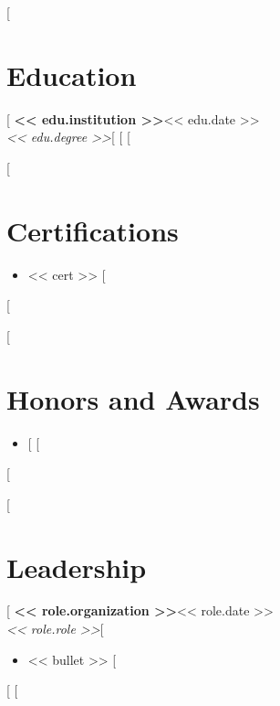 \documentclass[letterpaper,10pt]{article}
\begin{document}
[%
\section{Education}
[%
\noindent\textbf{<< edu.institution >>}\hfill\textcolor{secondary}{<< edu.date >>}\\
{\itshape\color{secondary}<< edu.degree >>}[%
\vspace{3pt}
[%
[%

[%
\section{Certifications}
\begin{itemize}
[%
  \item << cert >>
[%
\end{itemize}
[%

[%
\section{Honors and Awards}
\begin{itemize}
[%
  \item [%
[%
\end{itemize}
[%

[%
\section{Leadership}
[%
\noindent\textbf{<< role.organization >>}\hfill\textcolor{secondary}{<< role.date >>}\\
{\itshape\color{secondary}<< role.role >>}[%
\begin{itemize}
[%
  \item << bullet >>
[%
\end{itemize}
[%
[%
\end{document}
